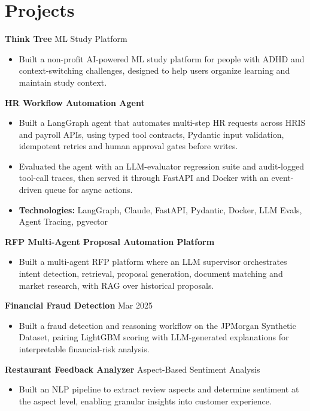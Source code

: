 \documentclass[10pt,a4paper]{article}
\begin{document}
\section{Projects}
\textbf{Think Tree} \textbar{} ML Study Platform\par
\begin{itemize}
  \item Built a non-profit AI-powered ML study platform for people with ADHD and context-switching challenges, designed to help users organize learning and maintain study context.
\end{itemize}
\textbf{HR Workflow Automation Agent}\par
\begin{itemize}
  \item Built a LangGraph agent that automates multi-step HR requests across HRIS and payroll APIs, using typed tool contracts, Pydantic input validation, idempotent retries and human approval gates before writes.
  \item Evaluated the agent with an LLM-evaluator regression suite and audit-logged tool-call traces, then served it through FastAPI and Docker with an event-driven queue for async actions.
  \item \textbf{Technologies:} LangGraph, Claude, FastAPI, Pydantic, Docker, LLM Evals, Agent Tracing, pgvector
\end{itemize}
\textbf{RFP Multi-Agent Proposal Automation Platform}\par
\begin{itemize}
  \item Built a multi-agent RFP platform where an LLM supervisor orchestrates intent detection, retrieval, proposal generation, document matching and market research, with RAG over historical proposals.
\end{itemize}
\textbf{Financial Fraud Detection} \textbar{} Mar 2025\par
\begin{itemize}
  \item Built a fraud detection and reasoning workflow on the JPMorgan Synthetic Dataset, pairing LightGBM scoring with LLM-generated explanations for interpretable financial-risk analysis.
\end{itemize}
\textbf{Restaurant Feedback Analyzer} \textbar{} Aspect-Based Sentiment Analysis\par
\begin{itemize}
  \item Built an NLP pipeline to extract review aspects and determine sentiment at the aspect level, enabling granular insights into customer experience.
\end{itemize}
\end{document}
